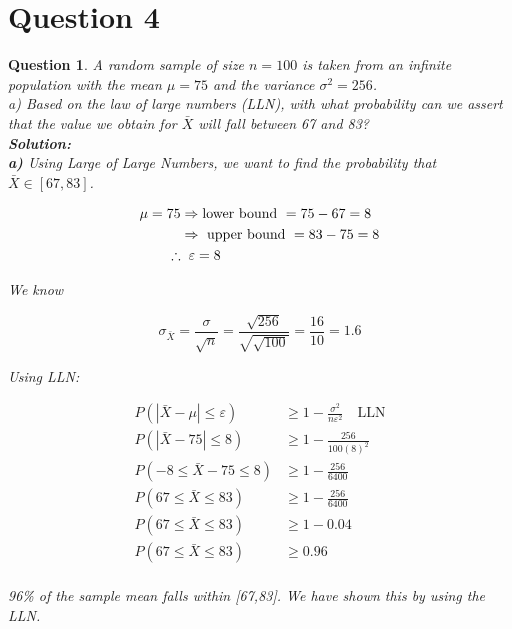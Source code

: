 \documentclass{article}
\theoremstyle{questionstyle}
\newtheorem{myquestion}{Question}
\begin{document}
\section{Question 4}
\begin{myquestion}
     A random sample of size \(n=100\) is taken from an infinite population with the mean \( \mu = 75 \) and the variance \(\sigma^2 = 256\).\\

    a) Based on the law of large numbers (LLN), with what probability can we assert that the value we obtain for \(\bar{X}\) will fall between 67 and 83?\\

\textbf{Solution:}\\

    \textbf{a)} Using Large of Large Numbers, we want to find the probability that \(\bar{X} \in [67,83]\).

    \begin{align*}
        \mu = 75 &\Rightarrow \text{lower bound } = 75 - 67 = 8\\
                & \Rightarrow \text{ upper bound } = 83 - 75 = 8 \\
                \therefore & \hspace{.2cm} \varepsilon = 8
    \end{align*}

    We know 

    \[ \sigma_{\bar{X}} = \frac{\sigma}{\sqrt{n}} = \frac{\sqrt{256}}{\sqrt{\sqrt{100}}} = \frac{16}{10} = 1.6\]
    
    Using LLN: 
    
    \begin{align*}
        P(|\bar{X} - \mu| \leq \varepsilon ) &\geq 1- \frac{\sigma^2}{n\varepsilon^2} \quad \text{LLN}\\
        P(|\bar{X} - 75 | \leq 8 ) &\geq 1 - \frac{256}{100(8)^2}\\
        P( -8 \leq \bar{X} - 75 \leq 8 ) &\geq 1 - \frac{256}{6400}\\ 
        P( 67 \leq \bar{X} \leq 83 ) &\geq 1 - \frac{256}{6400}\\ 
        P( 67 \leq \bar{X} \leq 83 ) &\geq 1- 0.04\\
        P( 67 \leq \bar{X} \leq 83 ) &\geq 0.96\\
    \end{align*}

96\% of the sample mean falls within [67,83]. We have shown this by using the LLN.\\


\end{myquestion}
\end{document}
